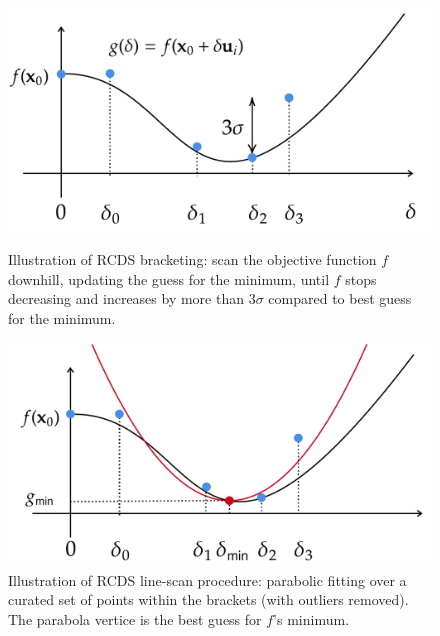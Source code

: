 \begin{figure}
    \begin{minipage}{0.48\textwidth}
        \centering
        \includegraphics[width=\textwidth]{Images/bracketing.pdf}
        \caption{Illustration of RCDS bracketing: scan the objective function $f$ downhill, updating the guess for the minimum, until $f$ stops decreasing and increases by more than $3\sigma$ compared to best guess for the minimum.}
        \label{fig:bracketing}
    \end{minipage}
    \hfill
    \begin{minipage}{0.48\textwidth}
        \centering
        \includegraphics[width=\textwidth]{Images/linescan.pdf}
        \caption{Illustration of RCDS line-scan procedure: parabolic fitting over a curated set of points within the brackets (with outliers removed). The parabola vertice is the best guess for $f$'s minimum.}
    \end{minipage}
\end{figure}
